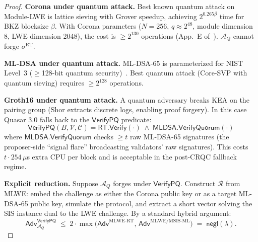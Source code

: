 \begin{proof}
\textbf{Corona under quantum attack.} Best known quantum attack on
Module-LWE is lattice sieving with Grover speedup, achieving
$2^{0.265\beta}$ time for BKZ blocksize $\beta$. With Corona
parameters ($N{=}256$, $q \approx 2^{48}$, module dimension 8, LWE
dimension 2048), the cost is $\geq 2^{130}$ operations
(App.~E of~\cite{qcert-proof}). $\mathcal{A}_Q$ cannot forge
$\sigma^{\mathrm{RT}}$.

\textbf{ML-DSA under quantum attack.} ML-DSA-65 is parameterized for
NIST Level~3 ($\geq$128-bit quantum security)~\cite{nist-pqc}. Best
quantum attack (Core-SVP with quantum sieving) requires $\geq 2^{128}$
operations.

\textbf{Groth16 under quantum attack.} A quantum adversary breaks KEA
on the pairing group (Shor extracts discrete logs, enabling proof
forgery). In this case Quasar 3.0 falls back to the
$\mathsf{VerifyPQ}$ predicate:
\[
\mathsf{VerifyPQ}(B, \mathcal{V}, \mathcal{C}) =
\mathsf{RT.Verify}(\cdot) \;\land\;
\mathsf{MLDSA.VerifyQuorum}(\cdot)
\]
where $\mathsf{MLDSA.VerifyQuorum}$ checks $\geq t$ raw ML-DSA-65
signatures (the proposer-side ``signal flare'' broadcasting validators'
raw signatures). This costs $t \cdot 254\,\mu$s extra CPU per block and
is acceptable in the post-CRQC fallback regime.

\textbf{Explicit reduction.} Suppose $\mathcal{A}_Q$ forges under
$\mathsf{VerifyPQ}$. Construct $\mathcal{R}$ from MLWE: embed the
challenge as either the Corona public key or as a target ML-DSA-65
public key, simulate the protocol, and extract a short vector solving
the SIS instance dual to the LWE challenge. By a standard hybrid
argument:
\[
\mathsf{Adv}^{\mathsf{VerifyPQ}}_{\mathcal{A}_Q} \;\leq\;
2 \cdot \max\bigl(\mathsf{Adv}^{\text{MLWE-RT}},\,
                  \mathsf{Adv}^{\text{MLWE/MSIS-ML}}\bigr) \;=\;
\mathsf{negl}(\lambda).
\]
\end{proof}


